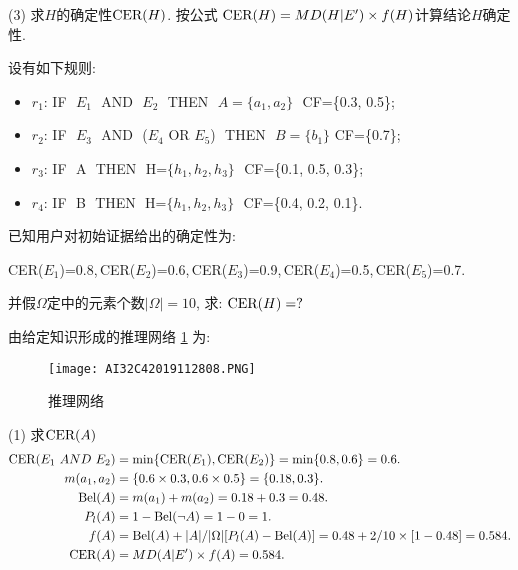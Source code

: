 (3) 求$H$的确定性$\textup{CER}(H)$. 按公式 $\textup{CER}(H)=MD(H|E') \times f(H)$计算结论$H$确定性.
\begin{example}
设有如下规则:
\begin{itemize}
    \item $r_1$:  IF\,\,  $E_1$\,\,  AND\,\,  $E_2$\,\,  THEN\,\,  $A=\{a_1, a_2\}$\,\,  \textup{CF}=\{0.3,  0.5\};
    \item $r_2$:  IF\,\,  $E_3$\,\,  AND\,\, ($E_4$  OR  $E_5$)\,\,  THEN\,\,  $B=\{b_1\}$  \textup{CF}=\{0.7\};
    \item $r_3$:  IF\,\,  A\,\,  THEN\,\,  H=$\{h_1, h_2, h_3\}$\,\,  \textup{CF}=\{0.1, 0.5, 0.3\};
    \item $r_4$:  IF\,\,  B\,\,  THEN\,\,  H=$\{h_1, h_2, h_3\}$\,\,  \textup{CF}=\{0.4, 0.2, 0.1\}.
\end{itemize}

已知用户对初始证据给出的确定性为:
\begin{center}
    \textup{CER}($E_1$)=0.8,\,\textup{CER}($E_2$)=0.6,\,\textup{CER}($E_3$)=0.9,\,\textup{CER}($E_4$)=0.5,\,\textup{CER}($E_5$)=0.7.
\end{center}
并假$\Omega$定中的元素个数$|\Omega|=10$, 求: $\textup{CER}(H)=?$
\end{example}
\begin{result}
由给定知识形成的推理网络 \ref{AI32fig2808} 为:
\begin{figure}[H]
    \centering
    \texttt{[image: AI32C42019112808.PNG]}
    \caption{推理网络}
    \label{AI32fig2808}
\end{figure}
\end{result}

(1) 求$\textup{CER}(A)$
\begin{align*}
 \textup{CER}(E_1\,\, AND\,\,  E_2)&=\min\{\textup{CER}(E_1), \textup{CER}(E_2)\}=\min\{0.8,  0.6\}=0.6.\\
   m({a_1}, {a_2})&=\{0.6\times 0.3, 0.6\times 0.5\}=\{0.18, 0.3\}.\\
   \textup{Bel}(A)&=m({a_1})+m({a_2})=0.18+0.3=0.48.\\
   P_l(A)&=1-\textup{Bel}(\neg A)=1-0=1.\\
   f(A)&=\textup{Bel}(A)+|A|/|\Omega| [P_l(A)-\textup{Bel}(A)]=0.48+2/10\times [1-0.48] =0.584.\\
  \textup{CER}(A)&=MD(A|E')\times f(A)=0.584.
\end{align*}

